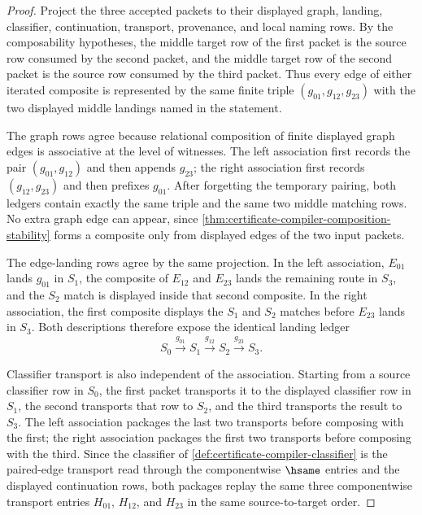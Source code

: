 \begin{proof}
Project the three accepted packets to their displayed graph, landing,
classifier, continuation, transport, provenance, and local naming rows. By the
composability hypotheses, the middle target row of the first packet is the
source row consumed by the second packet, and the middle target row of the
second packet is the source row consumed by the third packet. Thus every edge
of either iterated composite is represented by the same finite triple
$(g_{01},g_{12},g_{23})$ with the two displayed middle landings named in the
statement.

The graph rows agree because relational composition of finite displayed graph
edges is associative at the level of witnesses. The left association first
records the pair $(g_{01},g_{12})$ and then appends $g_{23}$; the right
association first records $(g_{12},g_{23})$ and then prefixes $g_{01}$. After
forgetting the temporary pairing, both ledgers contain exactly the same triple
and the same two middle matching rows. No extra graph edge can appear, since
\autoref{thm:certificate-compiler-composition-stability} forms a composite
only from displayed edges of the two input packets.

The edge-landing rows agree by the same projection. In the left association,
$E_{01}$ lands $g_{01}$ in $S_1$, the composite of $E_{12}$ and $E_{23}$
lands the remaining route in $S_3$, and the $S_2$ match is displayed inside
that second composite. In the right association, the first composite displays
the $S_1$ and $S_2$ matches before $E_{23}$ lands in $S_3$. Both descriptions
therefore expose the identical landing ledger
$$
S_0 \xrightarrow{g_{01}} S_1 \xrightarrow{g_{12}} S_2 \xrightarrow{g_{23}} S_3.
$$

Classifier transport is also independent of the association. Starting from a
source classifier row in $S_0$, the first packet transports it to the displayed
classifier row in $S_1$, the second transports that row to $S_2$, and the third
transports the result to $S_3$. The left association packages the last two
transports before composing with the first; the right association packages the
first two transports before composing with the third. Since the classifier of
\autoref{def:certificate-compiler-classifier} is the paired-edge transport
read through the componentwise $\hsame$ entries and the displayed
continuation rows, both packages replay the same three componentwise transport
entries $H_{01}$, $H_{12}$, and $H_{23}$ in the same source-to-target order.


\end{proof}
